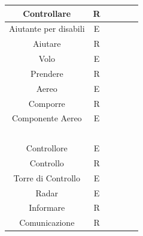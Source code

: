 \begin{tabular}{ | c  c  c | c  c  c | }
	\hline
	\textsf{\small Controllare} & \textsf{\small R} & \textsf{\small $ $} & \textsf{\small } & \textsf{\small } & \textsf{\small $ $}\\
	\hline
	\textsf{\small Aiutante per disabili} & \textsf{\small E} & \textsf{\small $ $} & \textsf{\small } & \textsf{\small } & \textsf{\small $ $}\\
	\hline
	\textsf{\small Aiutare} & \textsf{\small R} & \textsf{\small $ $} & \textsf{\small } & \textsf{\small } & \textsf{\small $ $}\\
	\hline
	\textsf{\small Volo} & \textsf{\small E} & \textsf{\small $ $} & \textsf{\small } & \textsf{\small } & \textsf{\small $ $}\\
	\hline
	\textsf{\small Prendere} & \textsf{\small R} & \textsf{\small $ $} & \textsf{\small } & \textsf{\small } & \textsf{\small $ $}\\
	\hline
	\textsf{\small Aereo} & \textsf{\small E} & \textsf{\small $ $} & \textsf{\small } & \textsf{\small } & \textsf{\small $ $}\\
	\hline
	\textsf{\small Comporre} & \textsf{\small R} & \textsf{\small $ $} & \textsf{\small } & \textsf{\small } & \textsf{\small $ $}\\
	\hline
	\textsf{\small Componente Aereo} & \textsf{\small E} & \textsf{\small $ $} & \textsf{\small } & \textsf{\small } & \textsf{\small $ $}\\
	\hline
	\textsf{\small } & \textsf{\small } & \textsf{\small $ $} & \textsf{\small } & \textsf{\small } & \textsf{\small $ $} \\
	\hline
	\textsf{\small Controllore} & \textsf{\small E} & \textsf{\small $ $} & \textsf{\small } & \textsf{\small } & \textsf{\small $ $}\\
	\hline
	\textsf{\small Controllo} & \textsf{\small R} & \textsf{\small $ $} & \textsf{\small } & \textsf{\small } & \textsf{\small $ $}\\
	\hline
	\textsf{\small Torre di Controllo} & \textsf{\small E} & \textsf{\small $ $} & \textsf{\small } & \textsf{\small } & \textsf{\small $ $}\\
	\hline
	\textsf{\small Radar} & \textsf{\small E} & \textsf{\small $ $} & \textsf{\small } & \textsf{\small } & \textsf{\small $ $}\\
	\hline
	\textsf{\small Informare} & \textsf{\small R} & \textsf{\small $ $} & \textsf{\small } & \textsf{\small } & \textsf{\small $ $}\\
	\hline
	\textsf{\small Comunicazione} & \textsf{\small R} & \textsf{\small $ $} & \textsf{\small } & \textsf{\small } & \textsf{\small $ $}\\

\end{tabular}
